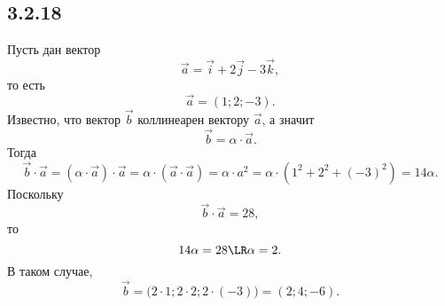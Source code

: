 \subsection{3.2.18}

Пусть дан вектор
\[
\vec a=\vec i+2\vec j-3\vec k,
\]
то есть
\[
\vec a=(1;2;-3).
\]
Известно, что вектор $\vec b$ коллинеарен вектору $\vec a$, а значит
\[
\vec b=\alpha\cdot\vec a.
\]
Тогда
\[
\vec b\cdot\vec a=(\alpha\cdot\vec a)\cdot\vec a=\alpha\cdot(\vec a\cdot\vec a)=\alpha\cdot a^2=\alpha\cdot\left(1^2+2^2+(-3)^2\right)=14\alpha.
\]
Поскольку
\[
\vec b\cdot\vec a=28,
\]
то
\[
14\alpha=28\LR\alpha=2.
\]
В таком случае,
\[
\vec b=\bigl(2\cdot1;2\cdot2;2\cdot(-3)\bigr)=(2;4;-6).
\]